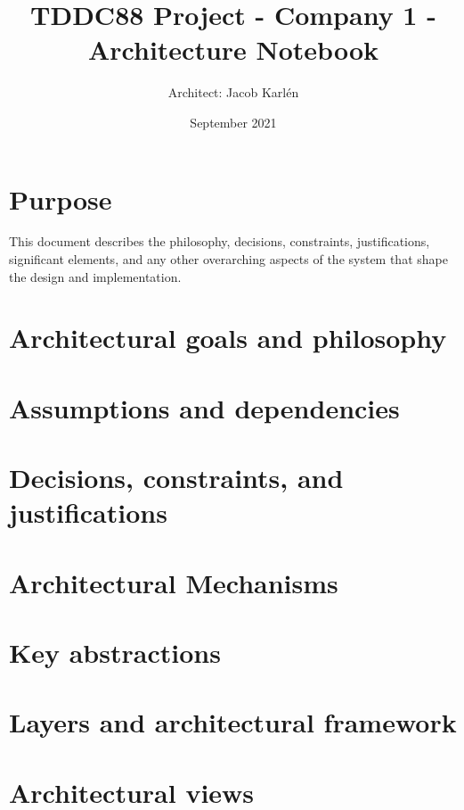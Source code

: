 \documentclass{article}
\title{TDDC88 Project - Company 1 - Architecture Notebook}
\author{Architect: Jacob Karlén}
\date{September 2021}
\begin{document}
\maketitle

\section{Purpose}
This document describes the philosophy, decisions, constraints, justifications, significant elements, and any other overarching aspects of the system that shape the design and implementation. 

\section{Architectural goals and philosophy}


\section{Assumptions and dependencies}

\section{Decisions, constraints, and justifications}

\section{Architectural Mechanisms}

\section{Key abstractions}

\section{Layers and architectural framework}

\section{Architectural views}
\end{document}
